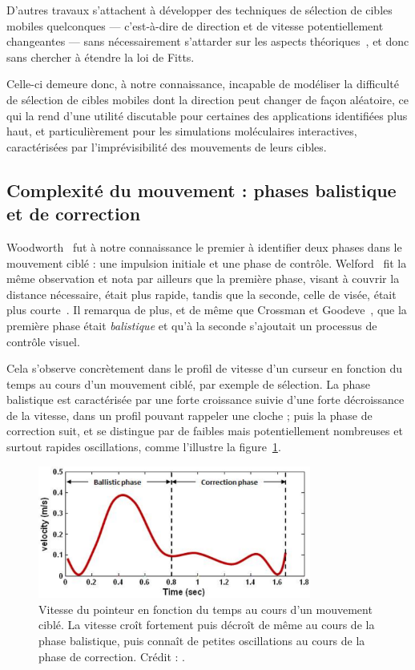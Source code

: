 	D'autres travaux s'attachent à développer des techniques de sélection de cibles mobiles \og quelconques \fg{} --- c'est-à-dire de direction et de vitesse potentiellement changeantes --- sans nécessairement s'attarder sur les aspects théoriques~\cite{hasan2011comet, ortega2013hook}, et donc sans chercher à étendre la loi de Fitts.
	
	Celle-ci demeure donc, à notre connaissance, incapable de modéliser la difficulté de sélection de cibles mobiles dont la direction peut changer de façon aléatoire, ce qui la rend d'une utilité discutable pour certaines des applications identifiées plus haut, et particulièrement pour les simulations moléculaires interactives, caractérisées par l'imprévisibilité des mouvements de leurs cibles.
	
	\subsection{Complexité du mouvement : phases balistique et de correction}
	Woodworth~\cite{woodworth1899accuracy} fut à notre connaissance le premier à identifier deux phases dans le mouvement ciblé : une impulsion initiale et une phase de contrôle. Welford~\cite{welford1968fundamentals} fit la même observation et nota par ailleurs que la première phase, visant à couvrir la distance nécessaire, était plus rapide, tandis que la seconde, celle de visée, était plus courte~\cite{mackenzie1987three}. Il remarqua de plus, et de même que Crossman et Goodeve~\cite{crossman1983feedback}, que la première phase était \emph{balistique} et qu'à la seconde s'ajoutait un processus de contrôle visuel.
	
	Cela s'observe concrètement dans le profil de vitesse d'un curseur en fonction du temps au cours d'un mouvement ciblé, par exemple de sélection. La phase balistique est caractérisée par une forte croissance suivie d'une forte décroissance de la vitesse, dans un profil pouvant rappeler une cloche ; puis la phase de correction suit, et se distingue par de faibles mais potentiellement nombreuses et surtout rapides oscillations, comme l'illustre la figure~\ref{fig:ballistic}.
	
	\begin{figure}[!htb]
		\centering
		\includegraphics[width=0.8\textwidth]{figures/ch2/ballistic}
		\caption[Profil de vitesse -- phases balistique et de correction]{Vitesse du pointeur en fonction du temps au cours d'un mouvement ciblé. La vitesse croît fortement puis décroît de même au cours de la phase balistique, puis connaît de petites oscillations au cours de la phase de correction. Crédit : \cite{liu2009designing}.}
		\label{fig:ballistic}
	\end{figure}
	
